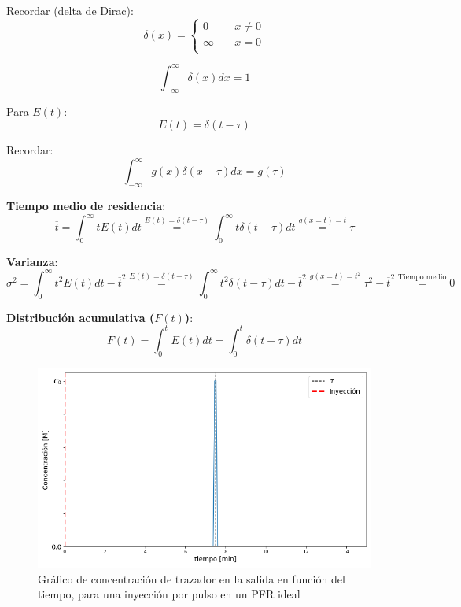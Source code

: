             
            Recordar (delta de Dirac):
            \begin{equation}
            \label{eq:delta_dirac}
                \delta (x) = \left \{
                \begin{matrix}
                    0 & \; & x \neq 0 \\ 
                    \infty & \; & x = 0 \\
                \end{matrix}
                \right .
            \end{equation}
            
            \[\int_{- \infty}^{\infty} \delta (x) dx = 1\]
            
            Para \(E(t)\):
            \[E(t) = \delta (t - \tau)\]
            
            Recordar:
            \[\int_{-\infty}^{\infty} g(x) \delta (x - \tau) dx = g(\tau)\]
            
            \textbf{Tiempo medio de residencia}:
            \[\overline{t} = \int_{0}^{\infty} t E(t) dt \overset{E(t) = \delta (t - \tau)}{=} \int_{0}^{\infty} t \delta (t - \tau) dt \overset{g(x=t) = t}{=} \tau\]
            
            \textbf{Varianza}:
            \[\sigma^{2} = \int_{0}^{\infty} t^{2} E(t) dt - \overline{t}^{2} \overset{E(t) = \delta (t - \tau)}{=}\int_{0}^{\infty} t^{2} \delta (t - \tau) dt - \overline{t}^{2} \overset{g(x=t) = t^{2}}{=} \tau^{2} - \overline{t}^{2} \overset{\text{Tiempo medio}}{=} 0\]
            
            \begin{quote}
                \textit{}
            \end{quote}
            
            \textbf{Distribución acumulativa (\(F(t)\))}:
            \[F(t) = \int_{0}^{t} E(t) dt = \int_{0}^{t} \delta (t - \tau) dt\]
            
            \begin{figure}
                \centering
                \includegraphics[width=.6\textwidth]{img/graficos/salida_pulso_pfr_ideal.png}
                \caption{Gráfico de concentración de trazador en la salida en función del tiempo, para una inyección por pulso en un PFR ideal}
                \label{fig:salida_pulso_pfr_ideal}
            \end{figure}
            
